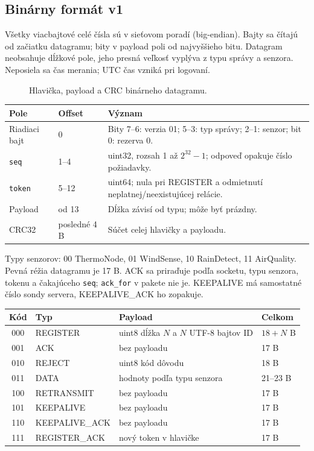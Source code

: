 \documentclass[12pt,a4paper]{article}
\begin{document}
\clearpage
\subsection{Binárny formát v1}

Všetky viacbajtové celé čísla sú v sieťovom poradí (big-endian). Bajty sa čítajú od začiatku datagramu; bity v payload poli od najvyššieho bitu. Datagram neobsahuje dĺžkové pole, jeho presná veľkosť vyplýva z typu správy a senzora. Neposiela sa čas merania; UTC čas vzniká pri logovaní.

\begin{figure}[!htbp]
\centering

\caption{Hlavička, payload a CRC binárneho datagramu.}
\end{figure}

\begin{center}\small\singlespacing
\begin{tabular}{p{2.8cm} p{2cm} p{8cm}}
\hline Pole & Offset & Význam \\\hline
Riadiaci bajt & 0 & Bity 7--6: verzia 01; 5--3: typ správy; 2--1: senzor; bit 0: rezerva 0. \\
\texttt{seq} & 1--4 & uint32, rozsah 1 až $2^{32}-1$; odpoveď opakuje číslo požiadavky. \\
\texttt{token} & 5--12 & uint64; nula pri REGISTER a odmietnutí neplatnej/neexistujúcej relácie. \\
Payload & od 13 & Dĺžka závisí od typu; môže byť prázdny. \\
CRC32 & posledné 4 B & Súčet celej hlavičky a payloadu. \\\hline
\end{tabular}\end{center}

Typy senzorov: 00 ThermoNode, 01 WindSense, 10 RainDetect, 11 AirQuality. Pevná réžia datagramu je 17 B. ACK sa priraďuje podľa socketu, typu senzora, tokenu a čakajúceho \texttt{seq}; \texttt{ack\_for} v pakete nie je. KEEPALIVE má samostatné číslo sondy servera, KEEPALIVE\_ACK ho zopakuje.

\begin{center}\small\singlespacing
\begin{tabular}{c l p{6.5cm} l}
\hline Kód & Typ & Payload & Celkom \\\hline
000 & REGISTER & uint8 dĺžka $N$ a $N$ UTF-8 bajtov ID & $18+N$ B \\
001 & ACK & bez payloadu & 17 B \\
010 & REJECT & uint8 kód dôvodu & 18 B \\
011 & DATA & hodnoty podľa typu senzora & 21--23 B \\
100 & RETRANSMIT & bez payloadu & 17 B \\
101 & KEEPALIVE & bez payloadu & 17 B \\
110 & KEEPALIVE\_ACK & bez payloadu & 17 B \\
111 & REGISTER\_ACK & nový token v hlavičke & 17 B \\\hline
\end{tabular}\end{center}
\end{document}
